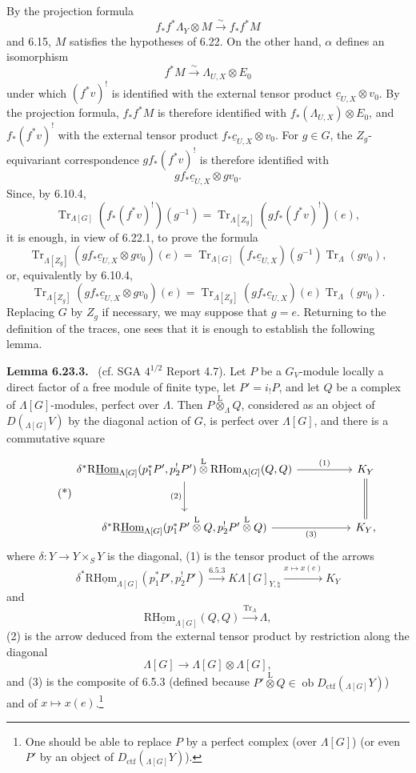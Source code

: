 \documentclass[11pt]{article}
\newenvironment{statement}[1]{\par\medskip\noindent\textbf{#1.}\ }{\par\medskip}
\newcommand{\ob}{\operatorname{ob}}
\providecommand{\RHom}{\mathrm{RHom}}
\providecommand{\Tr}{\operatorname{Tr}}
\providecommand{\Tr}{\operatorname{Tr}}
\providecommand{\lten}{\overset{\mathrm L}{\otimes}}
\providecommand{\Tr}{\operatorname{Tr}}
\providecommand{\RHom}{\mathrm{RHom}}
\providecommand{\ob}{\operatorname{ob}}
\providecommand{\lten}{\overset{\mathrm L}{\otimes}}
\providecommand{\RHom}{\mathrm R\mathcal{H}om}
\providecommand{\lten}{\overset{\mathrm L}{\otimes}}
\providecommand{\Tr}{\operatorname{Tr}}
\providecommand{\lten}{\overset{\mathrm L}{\otimes}}
\providecommand{\lten}{\overset{\mathrm L}{\otimes}}
\providecommand{\lten}{\overset{\mathrm L}{\otimes}}
\providecommand{\RHom}{\mathrm{RHom}}
\providecommand{\Tr}{\operatorname{Tr}}
\providecommand{\lten}{\overset{\mathrm L}{\otimes}}
\begin{document}
By the projection formula
\[
f_*f^*\Lambda_Y\otimes M\xrightarrow{\sim}f_*f^*M
\]
and 6.15, $M$ satisfies the hypotheses of 6.22. On the other hand, $\alpha$ defines an isomorphism
\[
f^*M\xrightarrow{\sim}\Lambda_{U,X}\otimes E_0
\]
under which $(f^*v)^!$ is identified with the external tensor product $\underline c_{U,X}\otimes v_0$. By the projection formula, $f_*f^*M$ is therefore identified with $f_*(\Lambda_{U,X})\otimes E_0$, and $f_*(f^*v)^!$ with the external tensor product $f_*\underline c_{U,X}\otimes v_0$. For $g\in G$, the $Z_g$-equivariant correspondence $gf_*(f^*v)^!$ is therefore identified with
\[
gf_*\underline c_{U,X}\otimes gv_0.
\]
Since, by 6.10.4,
\[
\Tr_{\Lambda[G]}(f_*(f^*v)^!)(g^{-1})
=
\Tr_{\Lambda[Z_g]}(gf_*(f^*v)^!)(e),
\]
it is enough, in view of 6.22.1, to prove the formula
\[
\Tr_{\Lambda[Z_g]}(gf_*\underline c_{U,X}\otimes gv_0)(e)
=
\Tr_{\Lambda[G]}(f_*\underline c_{U,X})(g^{-1})\Tr_{\Lambda}(gv_0),
\]
or, equivalently by 6.10.4,
\begin{equation}
\Tr_{\Lambda[Z_g]}(gf_*\underline c_{U,X}\otimes gv_0)(e)
=
\Tr_{\Lambda[Z_g]}(gf_*\underline c_{U,X})(e)\Tr_{\Lambda}(gv_0).
\tag{6.23.2}
\end{equation}
Replacing $G$ by $Z_g$ if necessary, we may suppose that $g=e$. Returning to the definition of the traces, one sees that it is enough to establish the following lemma.

\begin{statement}{Lemma 6.23.3}
(cf. SGA $4^{1/2}$ Report 4.7). Let $P$ be a $G_V$-module locally a direct factor of a free module of finite type, let $P'=i_!P$, and let $Q$ be a complex of $\Lambda[G]$-modules, perfect over $\Lambda$. Then $P\lten_{\Lambda}Q$, considered as an object of $D({}_{\Lambda[G]}V)$ by the diagonal action of $G$, is perfect over $\Lambda[G]$, and there is a commutative square
\begin{equation}\tag{*}
\begin{tikzcd}[column sep=huge,row sep=large]
\delta^*\mathrm{R}\underline{\mathrm{Hom}}_{\Lambda[G]}(p_1^*P',p_2^!P')\lten
\RHom_{\Lambda[G]}(Q,Q) \arrow[r,"(1)"] \arrow[d,"(2)"']
& K_Y \arrow[d,equal]\\
\delta^*\mathrm{R}\underline{\mathrm{Hom}}_{\Lambda[G]}(p_1^*P'\lten Q,p_2^!P'\lten Q) \arrow[r,"(3)"']
& K_Y ,
\end{tikzcd}
\end{equation}
where $\delta:Y\to Y\times_SY$ is the diagonal, (1) is the tensor product of the arrows
\[
\delta^*\mathrm{R}\underline{\mathrm{Hom}}_{\Lambda[G]}(p_1^*P',p_2^!P')\xrightarrow{6.5.3}
K\Lambda[G]_{Y,\natural}\xrightarrow{x\mapsto x(e)}K_Y
\]
and
\[
\mathrm{R}\underline{\mathrm{Hom}}_{\Lambda[G]}(Q,Q)\xrightarrow{\Tr_{\Lambda}}\Lambda,
\]
(2) is the arrow deduced from the external tensor product by restriction along the diagonal
\[
\Lambda[G]\to\Lambda[G]\otimes\Lambda[G],
\]
and (3) is the composite of 6.5.3 (defined because $P'\lten Q\in\ob D_{\mathrm{ctf}}({}_{\Lambda[G]}Y)$) and of $x\mapsto x(e)$.\footnote{One should be able to replace $P$ by a perfect complex (over $\Lambda[G]$) (or even $P'$ by an object of $D_{\mathrm{ctf}}({}_{\Lambda[G]}Y)$).}
\end{statement}
\end{document}
